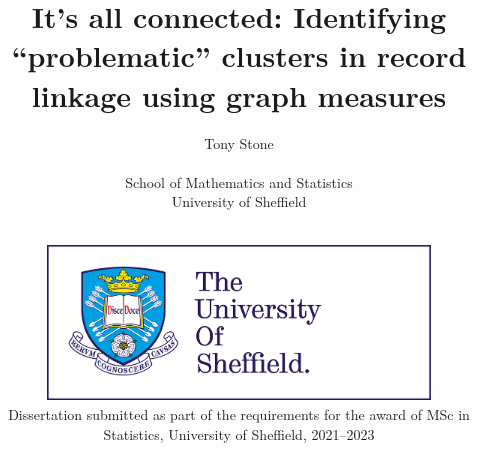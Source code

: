 


\title{It's all connected: Identifying “problematic” clusters in record linkage using graph measures}
\author{Tony Stone
\\$~$\vspace{0.5in}\\
School of Mathematics and Statistics\\
University of Sheffield}

\date{$~$\vspace{1.5in}\\
\includegraphics[width=4in]{figures/logo.jpg}\\
\vfill Dissertation submitted as part of the requirements for the award of MSc in Statistics, University of Sheffield, 2021--2023\\
}

\maketitle
